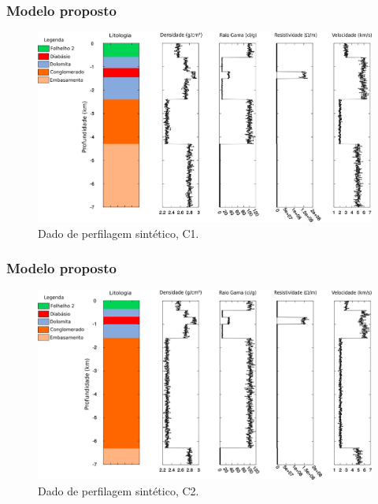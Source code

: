 \documentclass[aspectratio=10]{beamer} %
\begin{document}
\begin{frame}
\frametitle{Modelo proposto}
\begin{figure}[H]
\centering
\includegraphics[scale=0.37]{Imagens/PocoC1.png}
\caption{Dado de perfilagem sintético, C1.}
\label{C1}
\end{figure}
\end{frame}

\begin{frame}
\frametitle{Modelo proposto}
\begin{figure}[H]
\centering
\includegraphics[scale=0.37]{Imagens/PocoC2.png}
\caption{Dado de perfilagem sintético, C2.}
\label{C2}
\end{figure}
\end{frame}
\end{document}
